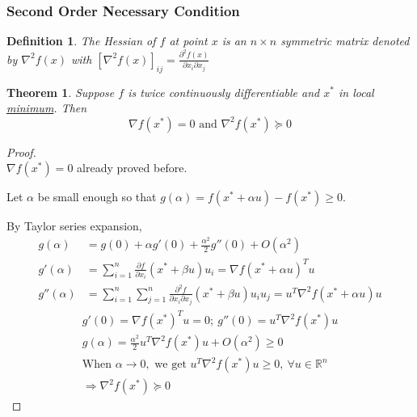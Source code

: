\documentclass[11pt,a4paper]{article}
\newtheorem{theorem}{Theorem}
\newtheorem{definition}{Definition}
\begin{document}
\subsubsection{Second Order Necessary Condition}
\begin{definition}
The Hessian of $f$ at point $x$ is an $n\times n$ symmetric matrix denoted by $\nabla^2 f(x)$ with $[\nabla^2 f(x)]_{ij}=\frac{\partial^2 f(x)}{\partial x_i\partial x_j}$
\end{definition}
\begin{theorem}
Suppose $f$ is twice continuously differentiable and $x^*$ in local \underline{minimum}. Then $$\nabla f(x^*)=0\text{ and }\nabla^2 f(x^*)\succeq 0$$
\end{theorem}
\begin{proof}
\quad\\
$\nabla f(x^*)=0$ already proved before.

Let $\alpha$ be small enough so that $g(\alpha)=f(x^*+\alpha u)-f(x^*)\geq 0$.

By Taylor series expansion,
\begin{equation}
    \begin{aligned}
        g(\alpha)&=g(0)+\alpha g'(0)+\frac{\alpha^2}{2}g''(0)+O(\alpha^2)\\
        g'(\alpha)&=\sum_{i=1}^n \frac{\partial f}{\partial x_i}(x^*+\beta u)u_i=\nabla f(x^*+\alpha u)^T u\\
        g''(\alpha)&=\sum_{i=1}^n\sum_{j=1}^n \frac{\partial^2 f}{\partial x_i\partial x_j}(x^*+\beta u)u_iu_j=u^T\nabla^2 f(x^*+\alpha u) u
    \end{aligned}
    \nonumber
\end{equation}
\begin{equation}
    \begin{aligned}
        g'(0)=\nabla f(x^*)^T u=0;\ g''(0)=u^T\nabla^2 f(x^*) u\\
        g(\alpha)=\frac{\alpha^2}{2}u^T\nabla^2 f(x^*) u+O(\alpha^2)\geq 0\\
        \text{When }\alpha \rightarrow 0,\text{ we get } u^T\nabla^2 f(x^*) u\geq 0,\ \forall u\in \mathbb{R}^n\\
        \Rightarrow	\nabla^2 f(x^*)\succeq 0
    \end{aligned}
    \nonumber
\end{equation}
\end{proof}
\end{document}

